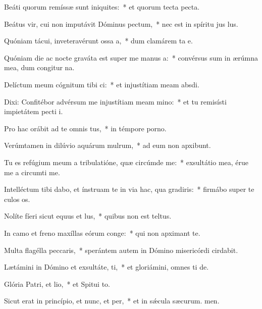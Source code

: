 \item Beáti quorum remíssæ sunt iniquites:~* et quorum tecta  pecta.
\item Beátus vir, cui non imputávit Dóminus pectum,~* nec est in spíritu jus lus.
\item Quóniam tácui, inveteravérunt ossa a,~* dum clamárem ta e.
\item Quóniam die ac nocte graváta est super me manus a:~* convérsus sum in ærúmna mea, dum congitur na.
\item Delíctum meum cógnitum tibi ci:~* et injustítiam meam  absdi.
\item Dixi: Confitébor advérsum me injustítiam meam mino:~* et tu remisísti impietátem pecti i.
\item Pro hac orábit ad te omnis tus,~* in témpore porno.
\item Verúmtamen in dilúvio aquárum mulrum,~* ad eum non apxibunt.
\item Tu es refúgium meum a tribulatióne, quæ circúmde me:~* exsultátio mea, érue me a circumti me.
\item Intelléctum tibi dabo, et ínstruam te in via hac, qua gradiris:~* firmábo super te culos os.
\item Nolíte fíeri sicut equus et lus,~* quibus non est teltus.
\item In camo et freno maxíllas eórum conge:~* qui non apximant  te.
\item Multa flagélla peccaris,~* sperántem autem in Dómino misericórdi cirdabit.
\item Lætámini in Dómino et exsultáte, ti,~* et gloriámini, omnes ti de.
\item Glória Patri, et lio,~* et Spitui to.
\item Sicut erat in princípio, et nunc, et per,~* et in sǽcula sæcurum. men.
